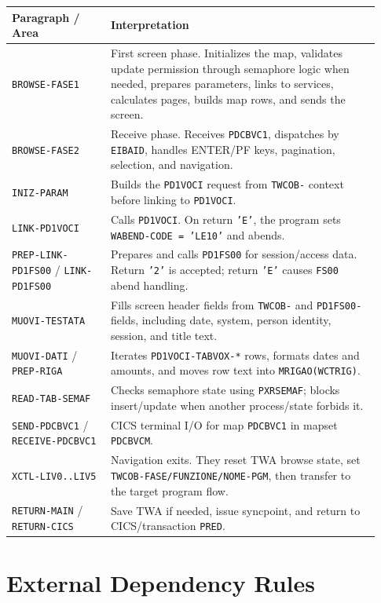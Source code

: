 \documentclass[11pt,a4paper]{article}
\begin{document}
\begin{longtable}{>{\raggedright\arraybackslash}p{0.25\linewidth} >{\raggedright\arraybackslash}p{0.68\linewidth}}
\textbf{Paragraph / Area} & \textbf{Interpretation} \\
\hline
\texttt{BROWSE-FASE1} & First screen phase. Initializes the map, validates update permission through semaphore logic when needed, prepares parameters, links to services, calculates pages, builds map rows, and sends the screen. \\
\texttt{BROWSE-FASE2} & Receive phase. Receives \texttt{PDCBVC1}, dispatches by \texttt{EIBAID}, handles ENTER/PF keys, pagination, selection, and navigation. \\
\texttt{INIZ-PARAM} & Builds the \texttt{PD1VOCI} request from \texttt{TWCOB-} context before linking to \texttt{PD1VOCI}. \\
\texttt{LINK-PD1VOCI} & Calls \texttt{PD1VOCI}. On return \texttt{'E'}, the program sets \texttt{WABEND-CODE = 'LE10'} and abends. \\
\texttt{PREP-LINK-PD1FS00} / \texttt{LINK-PD1FS00} & Prepares and calls \texttt{PD1FS00} for session/access data. Return \texttt{'2'} is accepted; return \texttt{'E'} causes \texttt{FS00} abend handling. \\
\texttt{MUOVI-TESTATA} & Fills screen header fields from \texttt{TWCOB-} and \texttt{PD1FS00-} fields, including date, system, person identity, session, and title text. \\
\texttt{MUOVI-DATI} / \texttt{PREP-RIGA} & Iterates \texttt{PD1VOCI-TABVOX-*} rows, formats dates and amounts, and moves row text into \texttt{MRIGAO(WCTRIG)}. \\
\texttt{READ-TAB-SEMAF} & Checks semaphore state using \texttt{PXRSEMAF}; blocks insert/update when another process/state forbids it. \\
\texttt{SEND-PDCBVC1} / \texttt{RECEIVE-PDCBVC1} & CICS terminal I/O for map \texttt{PDCBVC1} in mapset \texttt{PDCBVCM}. \\
\texttt{XCTL-LIV0..LIV5} & Navigation exits. They reset TWA browse state, set \texttt{TWCOB-FASE/FUNZIONE/NOME-PGM}, then transfer to the target program flow. \\
\texttt{RETURN-MAIN} / \texttt{RETURN-CICS} & Save TWA if needed, issue syncpoint, and return to CICS/transaction \texttt{PRED}. \\
\end{longtable}

\section*{External Dependency Rules}
\end{document}
